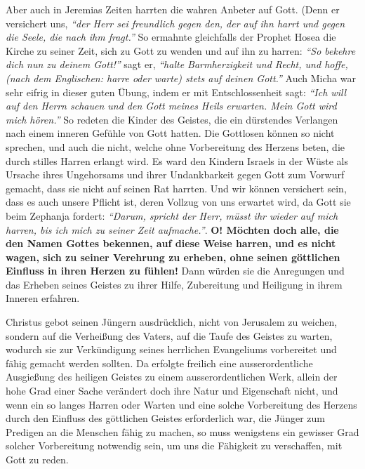 \medskip

Aber auch in Jeremias Zeiten harrten die wahren
Anbeter auf Gott. (Denn er
versichert uns,
\textit{ "`der Herr sei freundlich gegen den, der auf ihn harrt und
gegen die Seele, die nach ihm fragt."'}
So ermahnte
gleichfalls der Prophet Hosea die Kirche zu seiner Zeit,
sich zu Gott zu wenden
und auf ihn zu harren:
\textit{"`So bekehre dich nun zu deinem Gott!"'} sagt er,
\textit{"`halte
Barmherzigkeit und Recht, und hoffe, (nach dem Englischen: harre oder warte)
stets auf deinen Gott."'}
Auch Micha war sehr eifrig in
dieser guten Übung, indem er mit Entschlossenheit sagt:
\textit{"`Ich will auf den
Herrn schauen und den Gott meines Heils erwarten. Mein Gott wird mich
hören."'}
So redeten die Kinder des Geistes, die ein
dürstendes Verlangen nach einem inneren Gefühle von Gott hatten. Die Gottlosen
können so nicht sprechen, und auch die nicht, welche ohne Vorbereitung des
Herzens beten, die durch stilles Harren erlangt wird. Es ward den Kindern
Israels
in der Wüste als Ursache ihres Ungehorsams und ihrer Undankbarkeit
gegen Gott zum Vorwurf gemacht, dass sie nicht auf seinen Rat harrten. Und
wir können versichert sein, dass es auch unsere Pflicht ist, deren Vollzug
von uns erwartet wird, da Gott sie beim Zephanja
 fordert:
\textit{"`Darum, spricht
der Herr, müsst ihr wieder auf mich harren, bis ich mich zu seiner
Zeit aufmache."'}.
\textbf{O! Möchten doch alle, die den Namen
Gottes
bekennen, auf diese Weise harren, und es nicht wagen, sich zu seiner Verehrung
zu erheben, ohne seinen göttlichen Einfluss in ihren Herzen zu fühlen!} Dann
würden sie die Anregungen und das Erheben seines Geistes zu ihrer Hilfe,
Zubereitung
und Heiligung in ihrem Inneren erfahren.

\medskip

Christus gebot seinen Jüngern ausdrücklich, nicht von Jerusalem
 zu weichen,
sondern auf die Verheißung des Vaters, auf die Taufe des Geistes
 zu
warten,
wodurch sie zur Verkündigung seines herrlichen
Evangeliums vorbereitet und fähig gemacht werden sollten. Da erfolgte freilich
eine ausserordentliche Ausgießung des heiligen Geistes zu
einem
ausserordentlichen Werk, allein der hohe Grad einer Sache verändert doch ihre
Natur und Eigenschaft nicht, und wenn ein so langes Harren oder Warten und eine
solche Vorbereitung des Herzens durch den Einfluss des göttlichen Geistes
erforderlich war, die Jünger zum Predigen an die Menschen fähig zu machen, so
muss wenigstens ein gewisser Grad solcher Vorbereitung notwendig sein, um uns
die Fähigkeit zu verschaffen, mit Gott zu reden.

